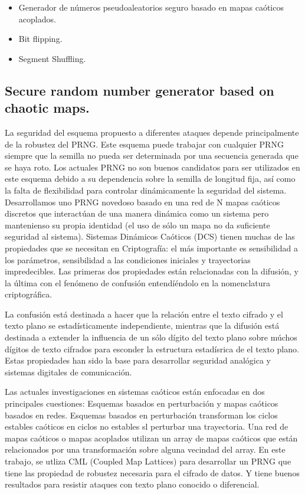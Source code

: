 \documentclass[10pt]{IEEEtran}
\begin{document}
\begin{itemize}
\item Generador de números pseudoaleatorios seguro basado en mapas caóticos acoplados.
\item Bit flipping.
\item Segment Shuffling.
\end{itemize}

\subsection{Secure random number generator based on chaotic maps.}
La seguridad del esquema propuesto a diferentes ataques  depende principalmente de la robustez del PRNG. Este esquema puede trabajar con cualquier PRNG siempre que la semilla no pueda ser determinada por una secuencia generada que se haya roto. Los actuales PRNG no son buenos candidatos para ser utilizados en este esquema debido a su dependencia sobre la semilla de longitud fija, así como la falta de flexibilidad para controlar dinámicamente la seguridad del sistema. Desarrollamos uno PRNG novedoso basado en una red de N mapas caóticos discretos que interactúan de una manera dinámica como un sistema pero mantenienso su propia identidad (el uso de sólo un mapa no da suficiente seguridad al sistema). Sistemas Dinámicos Caóticos  (DCS) tienen muchas de las propiedades que se necesitan en Criptografía: el más importante es sensibilidad a los parámetros, sensibilidad a las condiciones iniciales y trayectorias impredecibles. Las primeras dos propiedades están relacionadas con la difusión, y la última con el fenómeno de confusión entendíéndolo en la nomenclatura criptográfica.

La confusión está destinada a hacer que la relación entre el texto cifrado y el texto plano se estadísticamente independiente, mientras que la difusión está destinada a extender la influencia de un sólo dígito del texto plano sobre múchos dígitos de texto cifrados para esconder la estructura estadísrica de el texto plano. Estas propiedades han sido la base para desarrollar seguridad analógica y sistemas digitales de comunicación.

Las actuales investigaciones en sistemas caóticos están enfocadas en dos principales cuestiones: Esquemas basados en perturbación y mapas caóticos basados en redes. Esquemas basados en perturbación transforman los ciclos estables caóticos en ciclos no estables sl perturbar una trayectoria. Una red de mapas caóticos o mapas acoplados utilizan un array de mapas caóticos que están relacionados por una transformación sobre alguna vecindad del array. En este trabajo, se utliza CML (Coupled Map Lattices) para desarrollar un PRNG que tiene las propiedad de robustez necesaria para el cifrado de datos. Y tiene buenos resultados para resistir ataques con texto plano conocido o diferencial.
\end{document}
